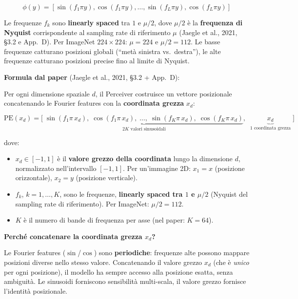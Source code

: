 \documentclass[
  11pt,
]{article}
\begin{document}
\[\phi(y) = \left\lbrack \sin\left( f_{1}\pi y \right),\cos\left( f_{1}\pi y \right),\ldots,\sin\left( f_{L}\pi y \right),\cos\left( f_{L}\pi y \right) \right\rbrack\]

Le frequenze $f_k$ sono \textbf{linearly spaced} tra $1$ e $\mu/2$, dove $\mu/2$ è la \textbf{frequenza di Nyquist} corrispondente al sampling rate di riferimento $\mu$ (Jaegle et al., 2021, \S3.2 e App.\ D). Per ImageNet $224 \times 224$: $\mu = 224$ e $\mu/2 = 112$. Le basse frequenze catturano posizioni globali (``metà sinistra vs.\ destra''), le alte frequenze catturano posizioni precise fino al limite di Nyquist.

\begin{formulabox}[title={\textbf{Calcolo di $C$: perché 261 e non 3}}]

\textbf{Formula dal paper} (Jaegle et al., 2021, \S3.2 + App.\ D):

Per ogni dimensione spaziale $d$, il Perceiver costruisce un vettore posizionale concatenando le Fourier features con la \textbf{coordinata grezza} $x_d$:

\[
\text{PE}(x_d) = \Big[\; \underbrace{\sin(f_1 \pi\, x_d),\; \cos(f_1 \pi\, x_d),\; \ldots,\; \sin(f_K \pi\, x_d),\; \cos(f_K \pi\, x_d)}_{2K \text{ valori sinusoidali}},\;\; \underbrace{x_d}_{1 \text{ coordinata grezza}} \;\Big]
\]

dove:
\begin{itemize}
\item $x_d \in [-1, 1]$ è il \textbf{valore grezzo della coordinata} lungo la dimensione $d$, normalizzato nell'intervallo $[-1,1]$. Per un'immagine 2D: $x_1 = x$ (posizione orizzontale), $x_2 = y$ (posizione verticale).
\item $f_k$, $k = 1, \ldots, K$, sono le frequenze, \textbf{linearly spaced tra $1$ e $\mu/2$} (Nyquist del sampling rate di riferimento). Per ImageNet: $\mu/2 = 112$.
\item $K$ è il numero di bande di frequenza per asse (nel paper: $K = 64$).
\end{itemize}

\textbf{Perché concatenare la coordinata grezza $x_d$?}

Le Fourier features ($\sin$/$\cos$) sono \textbf{periodiche}: frequenze alte possono mappare posizioni diverse nello stesso valore. Concatenando il valore grezzo $x_d$ (che è \emph{unico} per ogni posizione), il modello ha sempre accesso alla posizione esatta, senza ambiguità. Le sinusoidi forniscono sensibilità multi-scala, il valore grezzo fornisce l'identità posizionale.


\end{formulabox}
\end{document}
